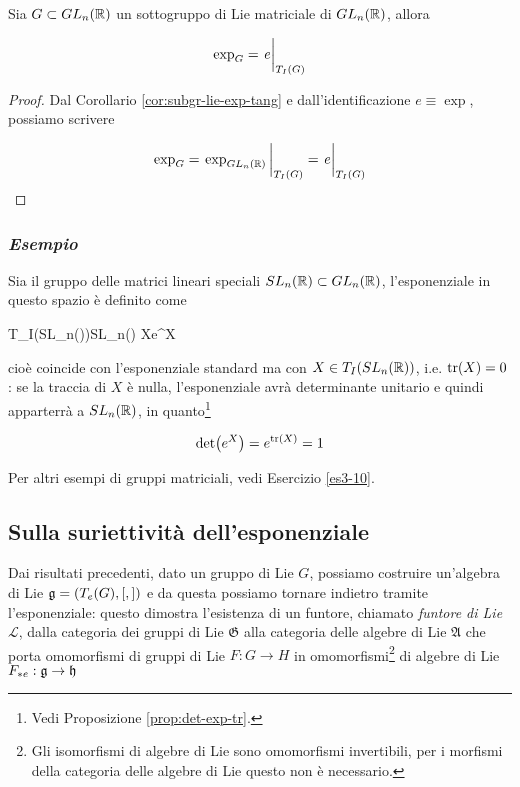 \begin{corollary}
	Sia $ G \subset GL_{n}(\mathbb{R}) $ un sottogruppo di Lie matriciale di $ GL_{n}(\mathbb{R}) $, allora
	
	\begin{equation}
		\exp_{G} = \eval{e}_{T_{I}(G)}
	\end{equation}
\end{corollary}

\begin{proof}
	Dal Corollario \ref{cor:subgr-lie-exp-tang} e dall'identificazione $ e \equiv \exp $, possiamo scrivere
	
	\begin{equation}
		\exp_{G} = \eval{ \exp_{GL_{n}(\R)} }_{T_{I}(G)} %
		= \eval{e}_{T_{I}(G)}
	\end{equation}
\end{proof}

\subsubsection{\textit{Esempio}}

Sia il gruppo delle matrici lineari speciali $ SL_{n}(\mathbb{R}) \subset GL_{n}(\mathbb{R}) $, l'esponenziale in questo spazio è definito come

	{T_{I}(SL_{n}(\R))}{SL_{n}(\R)}
	{X}{e^{X}}

cioè coincide con l'esponenziale standard ma con $ X \in T_{I}(SL_{n}(\mathbb{R})) $, i.e. $ \tr(X) = 0 $: se la traccia di $ X $ è nulla, l'esponenziale avrà determinante unitario e quindi apparterrà a $ SL_{n}(\mathbb{R}) $, in quanto\footnote{%
	Vedi Proposizione \ref{prop:det-exp-tr}.%
}

\begin{equation}
	\det(e^{X}) = e^{\tr(X)} = 1
\end{equation}

Per altri esempi di gruppi matriciali, vedi Esercizio \ref{es3-10}.

\subsection{Sulla suriettività dell'esponenziale}

Dai risultati precedenti, dato un gruppo di Lie $ G $, possiamo costruire un'algebra di Lie $ \mathfrak{g} = (T_{e}(G),[,]) $ e da questa possiamo tornare indietro tramite l'esponenziale: questo dimostra l'esistenza di un funtore, chiamato \textit{funtore di Lie} $ \mathcal{L} $, dalla categoria dei gruppi di Lie $ \mathfrak{G} $ alla categoria delle algebre di Lie $ \mathfrak{A} $ che porta omomorfismi di gruppi di Lie $ F : G \to H $ in omomorfismi\footnote{%
	Gli isomorfismi di algebre di Lie sono omomorfismi invertibili, per i morfismi della categoria delle algebre di Lie questo non è necessario.%
} di algebre di Lie $ F_{*e} : \mathfrak{g} \to \mathfrak{h} $

